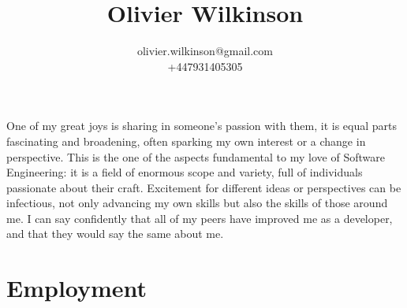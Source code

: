 \documentclass[a4paper,12pt]{article}
\title{\bfseries\Huge Olivier Wilkinson}
\author{olivier.wilkinson@gmail.com\\+447931405305}
\date{} %
\begin{document}
\maketitle

One of my great joys is sharing in someone's passion with them, it is equal
parts fascinating and broadening, often sparking my own interest or a change in
perspective. This is the one of the aspects fundamental to my love of Software
Engineering: it is a field of enormous scope and variety, full of individuals
passionate about their craft. Excitement for different ideas or perspectives
can be infectious, not only advancing my own skills but also the skills of those
around me. I can say confidently that all of my peers have improved me as a
developer, and that they would say the same about me.

\section*{Employment}
\end{document}
